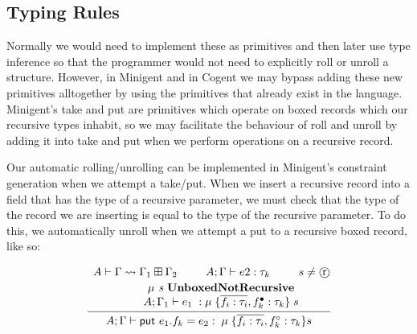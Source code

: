 \subsection{Typing Rules}


Normally we would need to implement these as primitives and then later use type inference so that
the programmer would not need to explicitly roll or unroll a structure. However,
in Minigent and in Cogent we may bypass adding these new primitives alltogether by using the primitives
that already exist in the language. Minigent's \textsf{take} and \textsf{put} are primitives which
operate on boxed records which our recursive types inhabit, so we may facilitate the behaviour
of roll and unroll by adding it into take and put when we perform operations on a recursive record.

Our automatic rolling/unrolling can be implemented in Minigent's constraint generation when we attempt a \textsf{take}/\textsf{put}.
When we insert a recursive record into a field that has the type of a recursive parameter, we must check that the type of the record
we are inserting is equal to the type of the recursive parameter. To do this, we automatically unroll
when we attempt a \textsf{put} to a recursive boxed record, like so: 

\begin{align*}
    \infer{
        A;\Gamma \vdash \textsf{put } e_1.f_k  = e_2 : \; \mu \; \{ \overline{f_i : \tau_i}, f_k^\circ : \tau_k \} s
    }{
        \begin{array}{c@{}c@{}c@{}c@{}c@{}}
            A \vdash \Gamma \rightsquigarrow \Gamma_1 \boxplus \Gamma_2 \hspace{2em}
            &
            A;\Gamma \vdash e2 : \tau_k \hspace{2em}
            &
            s \neq \text{\textcircled{r}}   \vspace{0.2em} \\
            &
            \hspace{-5em} \mu \textit{ s } \textbf{UnboxedNotRecursive} \\
            &
            \hspace{-5em}A;\Gamma_1 \vdash e_1\; : \mu\; \{ \overline{f_i : \tau_i}, f_k^\bullet : \tau_k \}\; s 
        \end{array}
    } \\ \\
\end{align*}

